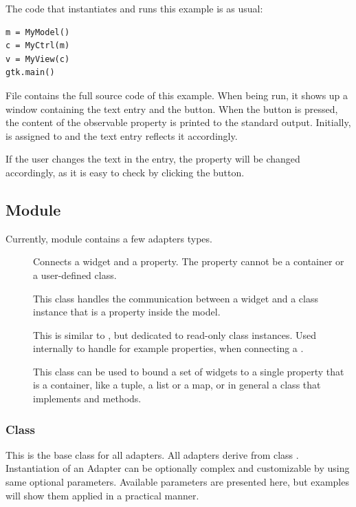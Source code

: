 The code that instantiates and runs this example is as usual:
{ \codesize
\begin{verbatim}
m = MyModel()
c = MyCtrl(m)
v = MyView(c)
gtk.main()
\end{verbatim}
}

File  contains the full source
code of this example. When being run, it shows up a window
containing the text entry and the button. When the button is
pressed, the content of the observable property  is
printed to the standard output. Initially,  is
assigned to  and the text entry reflects it
accordingly.

If the user changes the text in the entry, the property
 will be changed accordingly, as it is easy to check
by clicking the button.


\subsection{Module }
Currently, module  contains a few adapters types.

\begin{description}
\item [] Connects a widget and a property. The
  property cannot be a container or a user-defined class.

\item [] This class handles the
  communication between a widget and a class instance that is a
  property inside the model.

\item [] This is similar to
  , but dedicated to read-only class
  instances. Used internally to handle for example
   properties, when connecting a
  .

\item [] This class can be used to
  bound a set of widgets to a single property that is a container,
  like a tuple, a list or a map, or in general a class that
  implements  and
   methods.
\end{description}


\subsubsection{Class }
This is the base class for all adapters. All adapters derive from
class . Instantiation of an Adapter can be
optionally complex and customizable by using same optional
parameters. Available parameters are presented here, but examples
will show them applied in a practical manner. 

